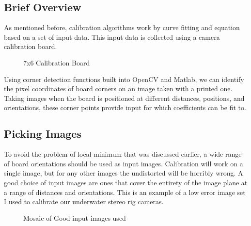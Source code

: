 \documentclass{article}
\begin{document}
\subsection{Brief Overview}

As mentioned before, calibration algorithms work by curve fitting and equation based on a set of input data. This input data is collected using a camera calibration board. 

\begin{figure}[h]
	\centering
	\caption{7x6 Calibration Board}
	\label{fig:board}
\end{figure}

Using corner detection functions built into OpenCV and Matlab, we can identify the pixel coordinates of board corners on an image taken with a printed one. Taking images when the board is positioned at different distances, positions, and orientations, these corner points provide input for which coefficients can be fit to. 

\subsection{Picking Images}

To avoid the problem of local minimum that was discussed earlier, a wide range of board orientations should be used as input images. Calibration will work on a single image, but for any other images the undistorted will be horribly wrong. A good choice of input images are ones that cover the entirety of the image plane at a range of distances and orientations. This is an example of a low error image set I used to calibrate our underwater stereo rig cameras. 

\begin{figure}[h]
	\centering
	\caption{Mosaic of Good input images used}
	\label{fig:cornerselect}
\end{figure}
\end{document}
